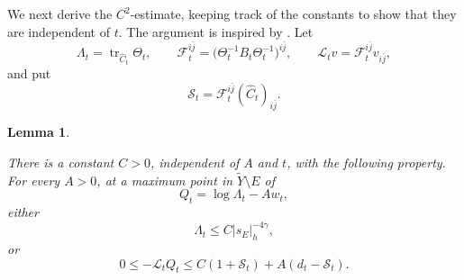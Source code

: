 \documentclass[reqno]{amsart}
\newcommand{\tr}{\operatorname{tr}}
\theoremstyle{plain}
\newtheorem{lemma}[thm]{Lemma}
\theoremstyle{remark}
\begin{document}
We next derive the $C^2$-estimate, keeping track of the constants to
show that they are independent of $t$. The argument is inspired by
\cite[Lemma~3.7]{T23}. Let
\[
 \Lambda_t=\tr_{\widehat C_t}\Theta_t,
 \qquad
 \mathcal F_t^{i\bar j}
 =\bigl(\Theta_t^{-1}B_t\Theta_t^{-1}\bigr)^{i\bar j},
 \qquad
 \mathcal L_t v=\mathcal F_t^{i\bar j}v_{i\bar j},
\]
and put
\[
 \mathcal S_t=\mathcal F_t^{i\bar j}(\widehat C_t)_{i\bar j}.
\]
\begin{lemma}
\label{lem:weighted-trace}

There is a constant $C>0$, independent of $A$ and $t$, with the
following property. For every $A>0$, at a maximum point in
$\widetilde Y\setminus E$ of
\[
 Q_t=\log\Lambda_t-Aw_t,
\]
either
\begin{equation}\label{eq:weighted-alternative}
 \Lambda_t\leq
 C|s_E|_{h}^{-4\gamma},
\end{equation}
or
\begin{equation}\label{eq:maximum-inequality}
 0\leq-\mathcal L_tQ_t
 \leq C(1+\mathcal S_t)+A(d_t-\mathcal S_t).
\end{equation}
\end{lemma}
\end{document}
